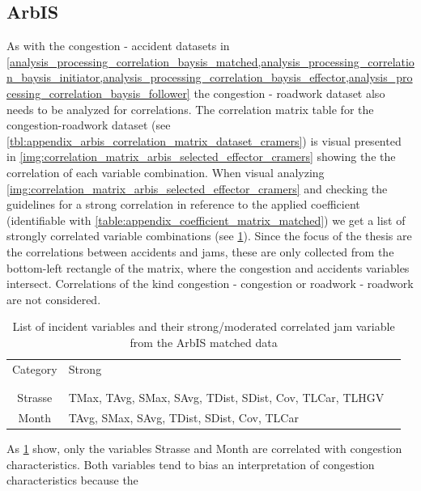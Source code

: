 \subsection{ArbIS}
\label{analysis_processing_correlation_arbis_matched}
As with the congestion - accident datasets in \cref{analysis_processing_correlation_baysis_matched,analysis_processing_correlation_baysis_initiator,analysis_processing_correlation_baysis_effector,analysis_processing_correlation_baysis_follower} the congestion - roadwork dataset also needs to be analyzed for correlations. The correlation matrix table for the congestion-roadwork dataset (see \cref{tbl:appendix_arbis_correlation_matrix_dataset_cramers}) is visual presented in \cref{img:correlation_matrix_arbis_selected_effector_cramers} showing the the correlation of each variable combination. When visual analyzing \cref{img:correlation_matrix_arbis_selected_effector_cramers} and checking the guidelines for a strong correlation in reference to the applied coefficient (identifiable with \cref{table:appendix_coefficient_matrix_matched}) we get a list of strongly correlated variable combinations (see \cref{tbl:correlation_list_arbis_matched}). Since the focus of the thesis are the correlations between accidents and jams, these are only collected from the bottom-left rectangle of the matrix, where the congestion and accidents variables intersect. Correlations of the kind congestion - congestion or roadwork - roadwork are not considered.
\begin{table}[h!]
	\centering
	\begin{tabular}{c|l|l}  
		Category & Strong \\
		\\[-1em]
		\hline
		\\[-1em]
		Strasse & TMax, TAvg, SMax, SAvg, TDist, SDist, Cov, TLCar, TLHGV \\ 
 		Month & TAvg, SMax, SAvg, TDist, SDist, Cov, TLCar \\
	\end{tabular}
  \caption{List of incident variables and their strong/moderated correlated jam variable from the ArbIS matched data}
  \label{tbl:correlation_list_arbis_matched}
\end{table}
As \cref{tbl:correlation_list_arbis_matched} show, only the variables Strasse and Month are correlated with congestion characteristics. Both variables tend to bias an interpretation of congestion characteristics because the 


